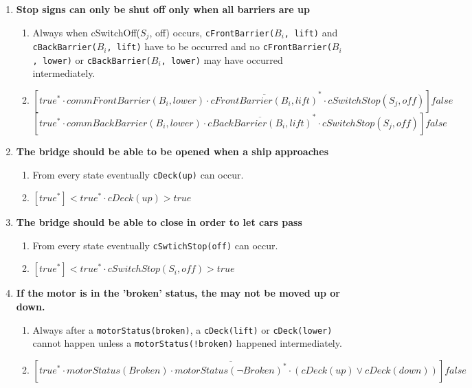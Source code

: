 \begin{enumerate}
	\item \textbf{Stop signs can only be shut off only when all barriers are up}
	\begin{enumerate}
		\item Always when cSwitchOff($S_j$, off) occurs, \texttt{cFrontBarrier($B_i$, lift)} and \texttt{cBackBarrier($B_i$, lift)} have to be occurred and no \texttt{cFrontBarrier($B_i$, lower)} or \texttt{cBackBarrier($B_i$, lower)} may have occurred intermediately.
		\item $[true^* \cdot commFrontBarrier(B_i, lower) \cdot \overline{cFrontBarrier(B_i, lift)}^{*} \cdot cSwitchStop(S_j, off)]false$
					$[true^* \cdot commBackBarrier(B_i, lower) \cdot \overline{cBackBarrier(B_i, lift)}^{*} \cdot cSwitchStop(S_j, off)]false$
	\end{enumerate}

	\item \textbf{The bridge should be able to be opened when a ship approaches}
	\begin{enumerate}
		\item From every state eventually \texttt{cDeck(up)} can occur.
		\item $[true^*]<true^* \cdot cDeck(up)>true$
	\end{enumerate}

	\item \textbf{The bridge should be able to close in order to let cars pass}
	\begin{enumerate}
		\item From every state eventually \texttt{cSwtichStop(off)} can occur.
		\item $[true^*]<true^* \cdot cSwitchStop(S_i, off)>true$
	\end{enumerate}

	\item \textbf{If the motor is in the 'broken' status, the may not be moved up or down.}
	\begin{enumerate}
		\item Always after a \texttt{motorStatus(broken)}, a \texttt{cDeck(lift)} or \texttt{cDeck(lower)} cannot happen unless a \texttt{motorStatus(!broken)} happened intermediately.
		\item $[true^* \cdot motorStatus(Broken) \cdot \overline{motorStatus(\neg Broken)^*}  \cdot (cDeck(up) \vee cDeck(down))]false$
	\end{enumerate}

\end{enumerate}

\newpage
